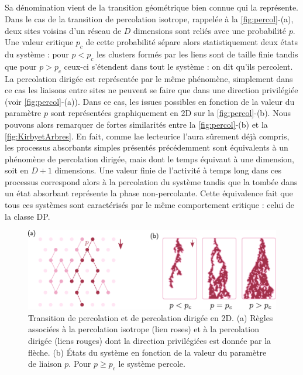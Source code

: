 \subparagraph{}Sa dénomination vient de la transition géométrique bien connue qui la représente. Dans le cas de la transition de percolation isotrope, rappelée à la \autoref{fig:percol}-(a), deux sites voisins d'un réseau de $D$ dimensions sont reliés avec une probabilité $p$. Une valeur critique $p_c$ de cette probabilité sépare alors statistiquement deux états du système : pour $p<p_c$ les clusters formés par les liens sont de taille finie tandis que pour $p>p_c$ ceux-ci s'étendent dans tout le système : on dit qu'ils percolent. La percolation dirigée est représentée par le même phénomène, simplement dans ce cas les liaisons entre sites ne peuvent se faire que dans une direction privilégiée (voir \autoref{fig:percol}-(a)). Dans ce cas, les issues possibles en fonction de la valeur du paramètre $p$ sont représentées graphiquement en 2D sur la \autoref{fig:percol}-(b). Nous pouvons alors remarquer de fortes similarités entre la \autoref{fig:percol}-(b) et la \autoref{fig:KirbyetArbres}. En fait, comme lae lecteurice l'aura sûrement déjà compris, les processus absorbants simples présentés précédemment sont équivalents à un phénomène de percolation dirigée, mais dont le temps équivaut à une dimension, soit en $D+1$ dimensions. Une valeur finie de l'activité à temps long dans ces processus correspond alors à la percolation du système tandis que la tombée dans un état absorbant représente la phase non-percolante. Cette équivalence fait que tous ces systèmes sont caractérisés par le même comportement critique : celui de la classe DP.

\begin{figure}[h]
	\centering
	\includegraphics[width=\textwidth]{Chapitre1/Figures/CDP/Percol.pdf}
	\caption{Transition de percolation et de percolation dirigée en 2D. (a) Règles associées à la percolation isotrope (lien roses) et à la percolation dirigée (liens rouges) dont la direction privilégiées est donnée par la flèche. (b) États du système en fonction de la valeur du paramètre de liaison $p$. Pour $p\geq p_c$ le système percole.}
	\label{fig:percol}
\end{figure}

